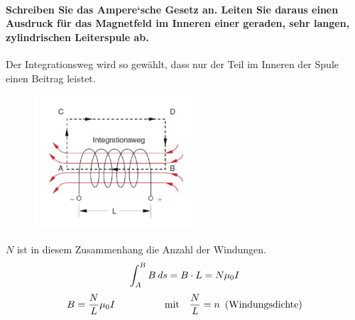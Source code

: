 \documentclass[a4paper, 11pt, parskip=half]{scrartcl}
\begin{document}
\paragraph{Schreiben Sie das Ampere‘sche Gesetz an. Leiten Sie daraus einen Ausdruck für das
Magnetfeld im Inneren einer geraden, sehr langen, zylindrischen Leiterspule ab.}
Der Integrationsweg wird so gewählt, dass nur der Teil im Inneren der Spule einen Beitrag leistet.
\begin{figure}
    \label{Integrationsweg}
    \includegraphics[height=5cm]{image/5/5.2.JPG}
\end{figure}
$N$ ist in diesem Zusammenhang die Anzahl der Windungen.
\begin{equation}
    \int_A^{B} B \hspace{0.2em} ds = B\cdot L = N\mu_0 I
\end{equation}
\begin{equation}
    B = \frac{N}{L}\mu_0 I \hspace{5em} \text{mit} \hspace{1em} \frac{N}{L} = n \hspace{0.5em} \text{(Windungsdichte)}
\end{equation}
\end{document}
